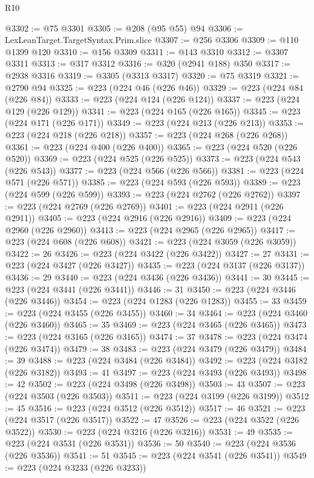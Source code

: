 \begin{lexlean}{R10}
\begin{coremodule}
@3302 := @75 @3301
@3305 := @208 (@95 @55) @94
@3306 := LexLeanTarget.TargetSyntax.Prim.slice
@3307 := @256 @3306
@3309 := @110 @1399 @120
@3310 := @156 @3309
@3311 := @143 @3310
@3312 := @3307 @3311
@3313 := @317 @3312
@3316 := @320 (@2941 @188) @350
@3317 := @2938 @3316
@3319 := @3305 (@3313 @3317)
@3320 := @75 @3319
@3321 := @2790 @94
@3325 := @223 (@224 @46 (@226 @46))
@3329 := @223 (@224 @84 (@226 @84))
@3333 := @223 (@224 @124 (@226 @124))
@3337 := @223 (@224 @129 (@226 @129))
@3341 := @223 (@224 @165 (@226 @165))
@3345 := @223 (@224 @171 (@226 @171))
@3349 := @223 (@224 @213 (@226 @213))
@3353 := @223 (@224 @218 (@226 @218))
@3357 := @223 (@224 @268 (@226 @268))
@3361 := @223 (@224 @400 (@226 @400))
@3365 := @223 (@224 @520 (@226 @520))
@3369 := @223 (@224 @525 (@226 @525))
@3373 := @223 (@224 @543 (@226 @543))
@3377 := @223 (@224 @566 (@226 @566))
@3381 := @223 (@224 @571 (@226 @571))
@3385 := @223 (@224 @593 (@226 @593))
@3389 := @223 (@224 @599 (@226 @599))
@3393 := @223 (@224 @2762 (@226 @2762))
@3397 := @223 (@224 @2769 (@226 @2769))
@3401 := @223 (@224 @2911 (@226 @2911))
@3405 := @223 (@224 @2916 (@226 @2916))
@3409 := @223 (@224 @2960 (@226 @2960))
@3413 := @223 (@224 @2965 (@226 @2965))
@3417 := @223 (@224 @608 (@226 @608))
@3421 := @223 (@224 @3059 (@226 @3059))
@3422 := 26
@3426 := @223 (@224 @3422 (@226 @3422))
@3427 := 27
@3431 := @223 (@224 @3427 (@226 @3427))
@3435 := @223 (@224 @3137 (@226 @3137))
@3436 := 29
@3440 := @223 (@224 @3436 (@226 @3436))
@3441 := 30
@3445 := @223 (@224 @3441 (@226 @3441))
@3446 := 31
@3450 := @223 (@224 @3446 (@226 @3446))
@3454 := @223 (@224 @1283 (@226 @1283))
@3455 := 33
@3459 := @223 (@224 @3455 (@226 @3455))
@3460 := 34
@3464 := @223 (@224 @3460 (@226 @3460))
@3465 := 35
@3469 := @223 (@224 @3465 (@226 @3465))
@3473 := @223 (@224 @3165 (@226 @3165))
@3474 := 37
@3478 := @223 (@224 @3474 (@226 @3474))
@3479 := 38
@3483 := @223 (@224 @3479 (@226 @3479))
@3484 := 39
@3488 := @223 (@224 @3484 (@226 @3484))
@3492 := @223 (@224 @3182 (@226 @3182))
@3493 := 41
@3497 := @223 (@224 @3493 (@226 @3493))
@3498 := 42
@3502 := @223 (@224 @3498 (@226 @3498))
@3503 := 43
@3507 := @223 (@224 @3503 (@226 @3503))
@3511 := @223 (@224 @3199 (@226 @3199))
@3512 := 45
@3516 := @223 (@224 @3512 (@226 @3512))
@3517 := 46
@3521 := @223 (@224 @3517 (@226 @3517))
@3522 := 47
@3526 := @223 (@224 @3522 (@226 @3522))
@3530 := @223 (@224 @3216 (@226 @3216))
@3531 := 49
@3535 := @223 (@224 @3531 (@226 @3531))
@3536 := 50
@3540 := @223 (@224 @3536 (@226 @3536))
@3541 := 51
@3545 := @223 (@224 @3541 (@226 @3541))
@3549 := @223 (@224 @3233 (@226 @3233))

\end{coremodule}
\end{lexlean}
